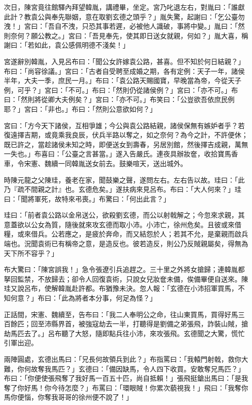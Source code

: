 次日，陳宮竟往館驛內拜望韓胤，講禮畢，坐定。宮乃叱退左右，對胤曰：「誰獻此計？教袁公與奉先聯姻，意在取劉玄德之頭乎？」胤失驚，起謝曰：「乞公臺勿洩！」宮曰：「吾自不洩，只恐其事若遲，必被他人識破，事將中變。」胤曰：「然則奈何？願公教之。」宮曰：「吾見奉先，使其即日送女就親，何如？」胤大喜，稱謝曰：「若如此，袁公感佩明德不淺矣！」

宮遂辭別韓胤，入見呂布曰：「聞公女許嫁袁公路，甚喜。但不知於何日結親？」布曰：「尚容徐議。」宮曰：「古者自受聘至成婚之期，各有定例：天子一年，諸侯半年，大夫一季，庶民一月。」布曰：「袁公路天賜國寶，早晚當為帝，今從天子例，可乎？」宮曰：「不可。」布曰：「然則仍從諸侯例？」宮曰：「亦不可。」布曰：「然則將從卿大夫例矣？」宮曰：「亦不可。」布笑曰：「公豈欲吾依庶民例耶？」宮曰：「非也。」布曰：「然則公意欲如何？」

宮曰：「方今天下諸侯，互相爭雄；今公與袁公路結親，諸侯保無有嫉妒者乎？若復遠擇吉期，或竟乘我良辰，伏兵半路以奪之，如之奈何？為今之計，不許便休；既已許之，當趁諸侯未知之時，即便送女到壽春，另居別館，然後擇吉成親，萬無一失也。」布喜曰：「公臺之言甚當。」遂入告嚴氏。連夜具辦妝奩，收拾寶馬香車，令宋憲、魏續一同韓胤送女前去。鼓樂喧天，送出城外。

時陳元龍之父陳珪，養老在家，聞鼓樂之聲，遂問左右。左右告以故。珪曰：「此乃『疏不間親之計』也。玄德危矣。」遂扶病來見呂布。布曰：「大人何來？」珪曰：「聞將軍死，故特來弔喪。」布驚曰：「何出此言？」

珪曰：「前者袁公路以金帛送公，欲殺劉玄德，而公以射戟解之；今忽來求親，其意蓋欲以公女為質，隨後就來攻玄德而取小沛。小沛亡，徐州危矣。且彼或來借糧，或來借兵。公若應之，是疲於奔命，而又結怨於人；若其不允，是棄親而啟兵端也。況聞袁術已有稱帝之意，是造反也。彼若造反，則公乃反賊親屬矣，得無為天下所不容乎？」

布大驚曰：「陳宮誤我！」急令張遼引兵追趕之。三十里之外將女搶歸；連韓胤都拏回監禁，不放歸去；卻令人回復袁術，只說女兒妝奩未備，俟備畢便自送來。陳珪又說呂布，使解韓胤赴許都。布猶豫未決。忽人報：「玄德在小沛招軍買馬，不知何意？」布曰：「此為將者本分事，何足為怪？」

正話間，宋憲、魏續至，告布曰：「我二人奉明公之命，往山東買馬，買得好馬三百餘匹；回至沛縣界首，被強寇劫去一半，打聽得是劉備之弟張飛，詐裝山賊，搶劫馬匹去了。」呂布聽了大怒，隨即點兵往小沛，來攻張飛。玄德聞之大驚，慌忙引軍出迎。

兩陣圓處，玄德出馬曰：「兄長何故領兵到此？」布指罵曰：「我轅門射戟，救你大難，你何故奪我馬匹？」玄德曰：「備因缺馬，令人四下收買。安敢奪兄馬匹？」布曰：「你便使張飛奪了我好馬一百五十匹，尚自抵賴！」張飛挺鎗出馬曰：「是我奪了你好馬！你今待怎麼？」布罵曰：「環眼賊！你累次藐視我！」飛曰：「我奪你馬你便惱，你奪我哥哥的徐州便不說了！」

